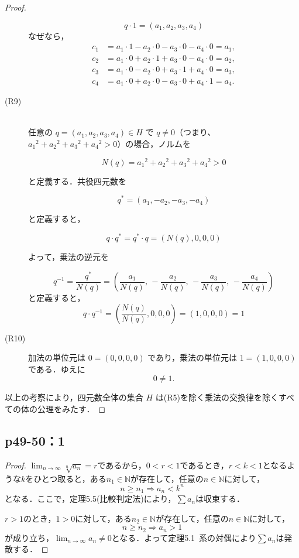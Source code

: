 \documentclass[a4paper,10pt,fleqn]{ltjsarticle}
\begin{document}
\begin{leftbar}
\begin{proof}
\begin{description}
\[
q \cdot 1 = (a_1, a_2, a_3, a_4)
\]
なぜなら，
\begin{align*}
c_1 &= a_1 \cdot 1 - a_2 \cdot 0 - a_3 \cdot 0 - a_4 \cdot 0 = a_1, \\
c_2 &= a_1 \cdot 0 + a_2 \cdot 1 + a_3 \cdot 0 - a_4 \cdot 0 = a_2, \\
c_3 &= a_1 \cdot 0 - a_2 \cdot 0 + a_3 \cdot 1 + a_4 \cdot 0 = a_3, \\
c_4 &= a_1 \cdot 0 + a_2 \cdot 0 - a_3 \cdot 0 + a_4 \cdot 1 = a_4.
\end{align*}
\item [(R9)] \mbox{} \\
任意の $q = (a_1, a_2, a_3, a_4) \in H$ で $q \ne 0$（つまり、${a_1}^2 + {a_2}^2 + {a_3}^2 + {a_4}^2 > 0$）の場合，ノルムを

\[
N(q) = {a_1}^2 + {a_2}^2 + {a_3}^2 + {a_4}^2 > 0
\]

と定義する．共役四元数を

\[
q^* = (a_1, -a_2, -a_3, -a_4)
\]

と定義すると，

\[
q \cdot q^* = q^* \cdot q = (N(q), 0, 0, 0)
\]

よって，乗法の逆元を

\[
q^{-1} = \frac{q^*}{N(q)} = \left( \frac{a_1}{N(q)},\, -\frac{a_2}{N(q)},\, -\frac{a_3}{N(q)},\, -\frac{a_4}{N(q)} \right)
\]
と定義すると，
\[
q \cdot q^{-1} = \left( \frac{N(q)}{N(q)}, 0, 0, 0 \right) = (1, 0, 0, 0) = 1
\]
\item [(R10)]
加法の単位元は $0 = (0, 0, 0, 0)$ であり，乗法の単位元は $1 = (1, 0, 0, 0)$ である．ゆえに
\[
0 \ne 1.
\]
\end{description}
以上の考察により，四元数全体の集合 $H$ は(R5)を除く乗法の交換律を除くすべての体の公理をみたす．
\end{proof}
\end{leftbar}
\newpage 

    \subsection*{p49-50：1}

\begin{tleftbar}
	\begin{proof}
		$\lim_{n \to \infty} \sqrt[n]{a_n} =r$であるから，$0<r<1$であるとき，$r<k<1$となるような$k$をひとつ取ると，ある$n_1 \in \mathbb{N}$が存在して，任意の$n \in \mathbb{N}$に対して，
		\[
			n \ge n_1 \Longrightarrow a_n<k^n
		\]
		となる．ここで，定理5.5(比較判定法)により，$\sum a_n$は収束する．

		$r>1$のとき，$1>0$に対して，ある$n_2 \in \mathbb{N}$が存在して，任意の$n \in \mathbb{N}$に対して，
		\[
			n \ge n_2 \Longrightarrow a_n >1
		\]
		が成り立ち，$\lim_{n \to \infty} a_n \ne 0$となる．よって定理5.1~系の対偶により$\sum a_n$は発散する．
	\end{proof}
\end{tleftbar}
\end{document}
